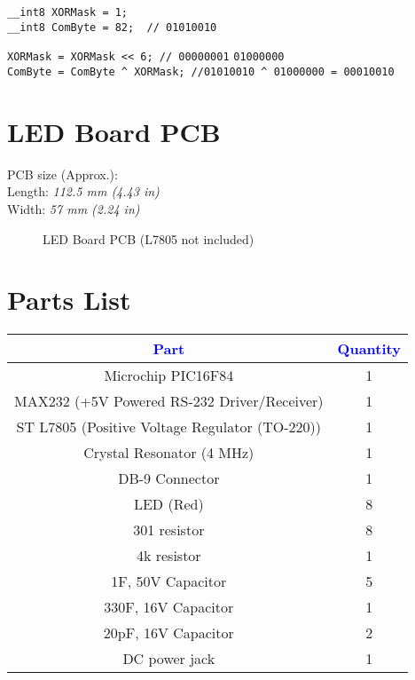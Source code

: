 \documentclass{article}
\begin{document}
\begin{verbatim}
__int8 XORMask = 1;
__int8 ComByte = 82;  // 01010010
\end{verbatim}
\verb"XORMask = XORMask << 6; // 00000001" 
\verb"01000000"\\
\verb"ComByte = ComByte ^ XORMask; //01010010 ^ 01000000 = 00010010"

\section{LED Board PCB}
PCB size (Approx.):\\
Length: \emph{112.5 mm (4.43 in)}\\
Width: \emph{57 mm (2.24 in)}\\

\begin{figure}

\hspace{1in}
\caption{LED Board PCB (L7805 not included)}
\label{fig:subfig} \end{figure}

\section{Parts List}
\begin{flushleft}
\begin{tabular}{|c|c|}
\hline
\textcolor{blue}{\textbf{Part}} & \textcolor{blue}{\textbf{Quantity}}\\
\hline
Microchip PIC16F84 & 1 \\
\hline
MAX232 (+5V Powered RS-232 Driver/Receiver) & 1\\
\hline
ST L7805 (Positive Voltage Regulator (TO-220)) & 1 \\
\hline
Crystal Resonator (4 MHz) & 1 \\
\hline
DB-9 Connector & 1 \\
\hline
LED (Red) & 8 \\
\hline
301 resistor & 8 \\
\hline
4k resistor & 1 \\
\hline
1F, 50V Capacitor & 5 \\
\hline
330F, 16V Capacitor & 1 \\
\hline
20pF, 16V Capacitor & 2 \\
\hline
DC power jack & 1 \\
\hline
\end{tabular}
\end{flushleft}
\end{document}
